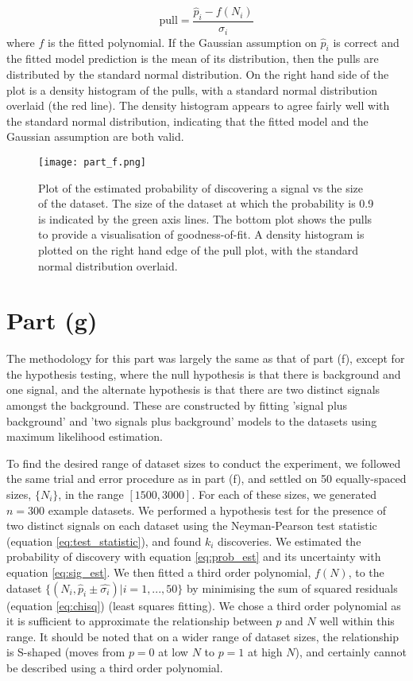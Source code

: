 \documentclass{article}
\begin{document}
\begin{equation}
\text{pull} = \frac{\hat{p}_i - f(N_i)}{\hat{\sigma_i}}
\label{eq:pull}
\end{equation}
where $f$ is the fitted polynomial. If the Gaussian assumption on $\hat{p}_i$ is correct and the fitted model prediction is the mean of its distribution, then the pulls are distributed by the standard normal distribution. On the right hand side of the plot is a density histogram of the pulls, with a standard normal distribution overlaid (the red line). The density histogram appears to agree fairly well with the standard normal distribution, indicating that the fitted model and the Gaussian assumption are both valid. 

\begin{figure}[h]
\centering
\texttt{[image: part\_f.png]}
\caption{Plot of the estimated probability of discovering a signal vs the size of the dataset. The size of the dataset at which the probability is 0.9 is indicated by the green axis lines. The bottom plot shows the pulls to provide a visualisation of goodness-of-fit. A density histogram is plotted on the right hand edge of the pull plot, with the standard normal distribution overlaid.}
\label{fig:f}
\end{figure} 

\section*{Part (g)}

The methodology for this part was largely the same as that of part (f), except for the hypothesis testing, where the null hypothesis is that there is background and one signal, and the alternate hypothesis is that there are two distinct signals amongst the background. These are constructed by fitting 'signal plus background' and 'two signals plus background' models to the datasets using maximum likelihood estimation. 

To find the desired range of dataset sizes to conduct the experiment, we followed the same trial and error procedure as in part (f), and settled on 50 equally-spaced sizes, $\{N_i\}$, in the range $[1500, 3000]$. For each of these sizes, we generated $n = 300$ example datasets. We performed a hypothesis test for the presence of two distinct signals on each dataset using the Neyman-Pearson test statistic (equation \ref{eq:test_statistic}), and found $k_i$ discoveries. We estimated the probability of discovery with equation \ref{eq:prob_est} and its uncertainty with equation \ref{eq:sig_est}. We then fitted a third order polynomial, $f(N)$, to the dataset $\{(N_i, \hat{p}_i \pm \hat{\sigma_i})| i = 1, ..., 50\}$ by minimising the sum of squared residuals (equation \ref{eq:chisq}) (least squares fitting). We chose a third order polynomial as it is sufficient to approximate the relationship between $p$ and $N$ well within this range. It should be noted that on a wider range of dataset sizes, the relationship is S-shaped (moves from $p=0$ at low $N$ to $p=1$ at high $N$), and certainly cannot be described using a third order polynomial. 
\end{document}
